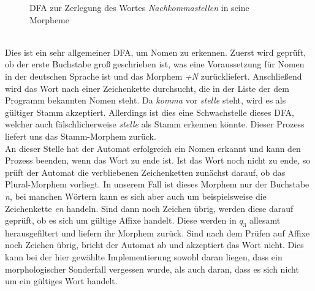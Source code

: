 \documentclass[12pt,twoside]{article}
\theoremstyle{plain}
\theoremstyle{definition}
\theoremstyle{remark}
\begin{document}
\begin{figure}[h]
\label{fig:dfa}
\caption{DFA zur Zerlegung des Wortes \textit{Nachkommastellen} in seine Morpheme}
\label{dfa1}
\end{figure}\\
Dies ist ein sehr allgemeiner DFA, um Nomen zu erkennen.
Zuerst wird geprüft, ob der erste Buchstabe groß geschrieben ist, was eine Voraussetzung für Nomen in der deutschen Sprache ist und das Morphem \textit{+N} zurückliefert.
Anschließend wird das Wort nach einer Zeichenkette durchsucht, die in der Liste der dem Programm bekannten Nomen steht.
Da \textit{komma} vor \textit{stelle} steht, wird es als gültiger Stamm akzeptiert.
Allerdings ist dies eine Schwachstelle dieses DFA, welcher auch fälschlicherweise \textit{stelle} als Stamm erkennen könnte. Dieser Prozess liefert uns das Stamm-Morphem zurück.\\
An dieser Stelle hat der Automat erfolgreich ein Nomen erkannt und kann den Prozess beenden, wenn das Wort zu ende ist.
Ist das Wort noch nicht zu ende, so prüft der Automat die verbliebenen Zeichenketten zunächst darauf, ob das Plural-Morphem vorliegt. 
In unserem Fall ist dieses Morphem nur der Buchstabe \textit{n}, bei manchen Wörtern kann es sich aber auch um beispielsweise die Zeichenkette \textit{en} handeln.
Sind dann noch Zeichen übrig, werden diese darauf geprüft, ob es sich um gültige Affixe handelt. Diese werden in $q_3$ allesamt herausgefiltert und liefern ihr Morphem zurück.
Sind nach dem Prüfen auf Affixe noch Zeichen übrig, bricht der Automat ab und akzeptiert das Wort nicht.
Dies kann bei der hier gewählte Implementierung sowohl daran liegen, dass ein morphologischer Sonderfall vergessen wurde, als auch daran, dass es sich nicht um ein gültiges Wort handelt.
\end{document}
